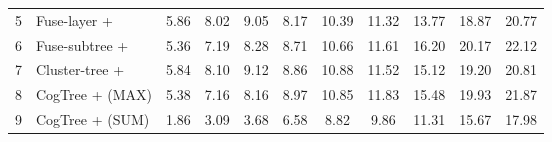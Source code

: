\documentclass{article}
\begin{document}
\begin{table}[t]
{\begin{tabular}{llccccccccc}
\\ 
\hline
\multicolumn{1}{l|}{5} & \multicolumn{1}{l|}{Fuse-layer + } & 5.86  & 8.02 & \multicolumn{1}{c|}{9.05}    & 8.17   & 10.39  & \multicolumn{1}{c|}{11.32}   & 13.77         & 18.87        & 20.77          
\\ 
\multicolumn{1}{l|}{6} & \multicolumn{1}{l|}{Fuse-subtree + }  & 5.36  & 7.19  & \multicolumn{1}{c|}{8.28}   & 8.71  & 10.66  & \multicolumn{1}{c|}{11.61}   & 16.20         & 20.17        & 22.12         \\
\multicolumn{1}{l|}{7} & \multicolumn{1}{l|}{Cluster-tree + }  & 5.84  & 8.10 & \multicolumn{1}{c|}{9.12}   & 8.86  & 10.88  & \multicolumn{1}{c|}{11.52}   & 15.12         & 19.20        & 20.81         \\
\hline
\multicolumn{1}{l|}{8} & \multicolumn{1}{l|}{CogTree + (MAX)}  & 5.38  & 7.16 & \multicolumn{1}{c|}{8.16}   & 8.97  & 10.85  & \multicolumn{1}{c|}{11.83}   & 15.48         & 19.93        & 21.87         \\
\multicolumn{1}{l|}{9} & \multicolumn{1}{l|}{CogTree + (SUM)}  & 1.86  & 3.09  & \multicolumn{1}{c|}{3.68}   & 6.58  & 8.82  & \multicolumn{1}{c|}{9.86}   & 11.31         & 15.67        & 17.98   \\      
\hline
\end{tabular}}
\label{tab:ablation}
\end{table}
\fi
\end{document}
